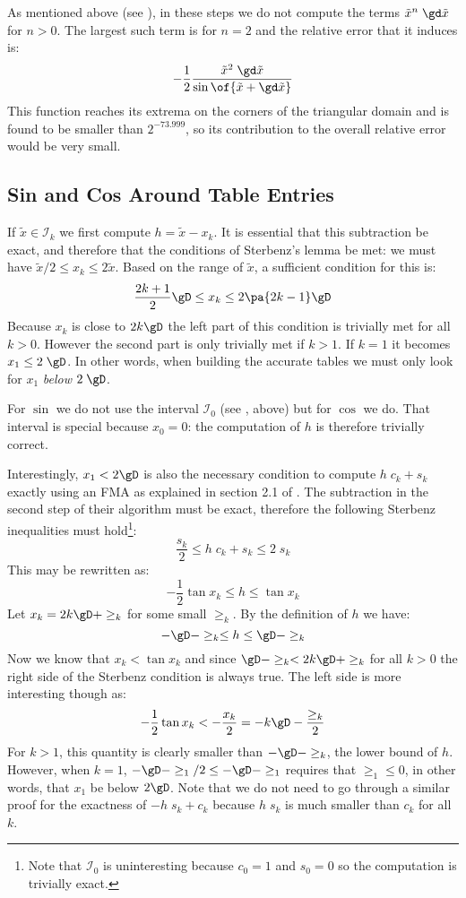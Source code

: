 \documentclass[10pt, a4paper, twoside]{basestyle}
\newcommand{\red}[1]{\tilde{#1}}
\begin{document}
As mentioned above (see ), in these steps we do not compute the terms ${\red x}^n \; \gd \red x$ for $n > 0$.  The largest such term is for $n = 2$ and the relative error that it induces is:
\[
-\frac{1}{2} \frac{{\red x}^2 \; \gd \red x}{\sin\of{\red x + \gd \red x}}
\]
This function reaches its extrema on the corners of the triangular domain and is found to be smaller than $2^{-73.999}$, so its contribution to the overall relative error would be very small.

\subsection*{Sin and Cos Around Table Entries}

If $\red x \in \mathscr{I}_k$ we first compute $h = \red x - x_k$.  It is essential that this subtraction be exact, and therefore that the conditions of Sterbenz's lemma be met: we must have $\red x / 2 \le x_k \le 2 \red x$.  Based on the range of $\red x$, a sufficient condition for this is:
\[
\frac{2 k + 1}{2} \gD \le x_k \le 2 \pa{2 k - 1} \gD
\]
Because $x_k$ is close to $2 k \gD$ the left part of this condition is trivially met for all $k > 0$.  However the second part is only trivially met if $k > 1$.  If $k = 1$ it becomes $x_1 \le 2 \; \gD$.  In other words, when building the accurate tables we must only look for $x_1$ \emph{below} $2 \; \gD$.

For $\sin$ we do not use the interval $\mathscr{I}_0$ (see , above) but for $\cos$ we do.  That interval is special because $x_0 = 0$: the computation of $h$ is therefore trivially correct.

Interestingly, $x_1 < 2 \gD$ is also the necessary condition to compute $h \; c_k + s_k$ exactly using an FMA as explained in section 2.1 of \cite{StehléZimmermann2005}.  The subtraction in the second step of their algorithm must be exact, therefore the following Sterbenz inequalities must hold\footnote{Note that $\mathscr{I}_0$ is uninteresting because $c_0 = 1$ and $s_0 = 0$ so the computation is trivially exact.}:
\[
\frac{s_k}{2} \le h \; c_k + s_k \le 2 \; s_k
\]
This may be rewritten as:
\[
-\frac{1}{2} \tan x_k \le h \le \tan x_k
\]
Let $x_k = 2 k \gD + \ge_k$ for some small $\ge_k$.  By the definition of $h$ we have:
\[
-\gD - \ge_k \le h \le \gD - \ge_k
\]
Now we know that $x_k < \tan x_k$ and since $\gD - \ge_k < 2 k \gD + \ge_k$ for all $k > 0$ the right side of the Sterbenz condition is always true.  The left side is more interesting though as:
\[
-\frac{1}{2} \tan x_k < -\frac{x_k}{2} = -k \gD - \frac{\ge_k}{2}
\]
For $k > 1$, this quantity is clearly smaller than $-\gD - \ge_k$, the lower bound of $h$.  However, when $k = 1$, $-\gD - \ge_1 / 2 \le -\gD - \ge_1$ requires that $\ge_1 \le 0$, in other words, that $x_1$ be below $2 \gD$.  Note that we do not need to go through a similar proof for the exactness of $-h \; s_k + c_k$ because $h \; s_k$ is much smaller than $c_k$ for all $k$.
\end{document}
